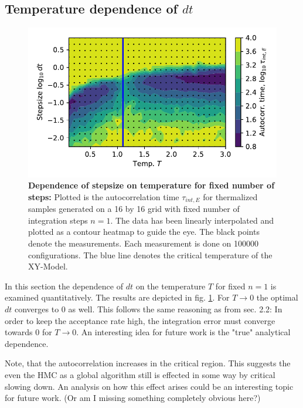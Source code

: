 \documentclass[11pt, a4paper]{scrartcl}
\begin{document}
\subsection{Temperature dependence of $dt$}
    \begin{figure}
    \begin{centering}
        \includegraphics{dt_over_T.pdf}
        \caption{\textbf{Dependence of stepsize on temperature for fixed number of steps: } Plotted is the autocorrelation time $\tau_{int, E}$ for thermalized samples generated on a 16 by 16 grid with fixed number of integration steps $n = 1$. The data has been linearly interpolated and plotted as a contour heatmap to guide the eye. The black points denote the measurements. Each measurement is done on 100000 configurations. The blue line denotes the critical temperature of the XY-Model.}
    \end{centering}
    \label{dt_over_T}
    \end{figure}
    In this section the dependence of $dt$ on the temperature $T$ for fixed $n = 1$ is examined quantitatively. The results are depicted in fig. \ref{dt_over_T}. For $T \rightarrow 0$ the optimal $dt$ converges to $0$ as well. This follows the same reasoning as from sec. 2.2: In order to keep the acceptance rate high, the integration error must converge towards $0$ for $T \rightarrow 0$. An interesting idea for future work is the "true" analytical dependence.

    Note, that the autocorrelation increases in the critical region. This suggests the even the HMC as a global algorithm still is effected in some way by critical slowing down. An analysis on how this effect arises could be an interesting topic for future work. (Or am I missing something completely obvious here?)
\end{document}
